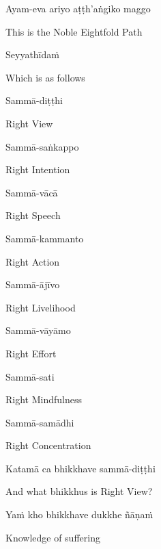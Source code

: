 Ayam-eva ariyo aṭṭh'aṅgiko maggo

\begin{english}
  This is the Noble Eightfold Path
\end{english}

Seyyathīdaṁ

\begin{english}
  Which is as follows
\end{english}

Sammā-diṭṭhi

\begin{english}
  Right View
\end{english}

Sammā-saṅkappo

\begin{english}
  Right Intention
\end{english}

Sammā-vācā

\begin{english}
  Right Speech
\end{english}

Sammā-kammanto

\begin{english}
  Right Action
\end{english}

Sammā-ājīvo

\begin{english}
  Right Livelihood
\end{english}

Sammā-vāyāmo

\begin{english}
  Right Effort
\end{english}

Sammā-sati

\begin{english}
  Right Mindfulness
\end{english}

Sammā-samādhi

\begin{english}
  Right Concentration
\end{english}

Katamā ca bhikkhave sammā-diṭṭhi

\begin{english}
  And what bhikkhus is Right View?
\end{english}

Yaṁ kho bhikkhave dukkhe ñāṇaṁ

\begin{english}
  Knowledge of suffering
\end{english}

